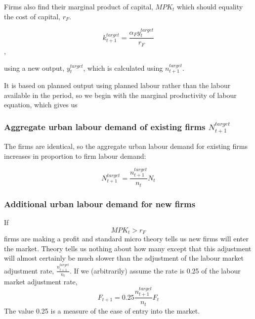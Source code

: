 Firms also find their marginal product of capital, $MPK_t$ which should equality the cost of capital, $r_F$. %

\begin{equation}k_{t+1}^{target}= \frac{\alpha_{F}{y}^{target}_{t}}{r_F}\end{equation},



using a new output, $y_t^{target}$, which is calculated using $n^{target}_{t+1}$. %

It is based on planned output using planned labour rather than the labour available in the period, so we begin with the marginal productivity of labour equation, 
which gives us 



\subsubsection{Aggregate urban labour demand of existing firms $N_{t+1}^{target}$} 

The firms are identical, so the aggregate urban labour demand for existing firms increases in proportion to firm labour demand:

\begin{equation}N_{t+1}^{target} = \frac{n^{target}_{t+1}}{n_{t}} N_t\end{equation}   


\subsubsection{Additional urban labour demand for new firms}
If \[ MPK_t > r_F \] firms are making a profit and standard micro theory tells us new firms will enter the market. Theory tells us nothing about how many except that this adjustment will almost certainly be much slower than the adjustment of the labour market adjustment rate, $\frac{n^{target}_{t+1}}{n_{t}}$. If we (arbitrarily) assume the rate is 0.25  of the labour market adjustment rate, 
\begin{equation}
F_{t+1}= 0.25\frac{n^{target}_{t+1}}{n_{t}}F_t
\end{equation} 
The value 0.25 is a measure of the ease of entry into the market.
 


